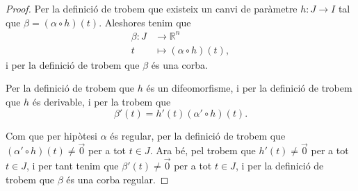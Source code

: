\documentclass[../Apunts.tex]{subfiles}
\begin{document}
	\begin{proof}
		Per la definició de  trobem que existeix un canvi de paràmetre \(h:J\longrightarrow I\) tal que \(\beta=(\alpha\circ h)(t)\). Aleshores tenim que
		\begin{align*}
			\beta\colon J&\longrightarrow\mathbb{R}^{n} \\
			t&\longmapsto(\alpha\circ h)(t),
		\end{align*}
		i per la definició de  trobem que \(\beta\) és una corba.
		
		Per la definició de  trobem que \(h\) és un difeomorfisme, i per la definició de  trobem que \(h\) és derivable, i per la  trobem que
		\[\beta'(t)=h'(t)(\alpha'\circ h)(t).\]
		
		Com que per hipòtesi \(\alpha\) és regular, per la definició de  trobem que \((\alpha'\circ h)(t)\neq\vec{0}\) per a tot \(t\in J\). Ara bé, pel \corollari{}  trobem que \(h'(t)\neq\vec{0}\) per a tot \(t\in J\), i per tant tenim que \(\beta'(t)\neq\vec{0}\) per a tot \(t\in J\), i per la definició de  trobem que \(\beta\) és una corba regular.
	\end{proof}
\end{document}
